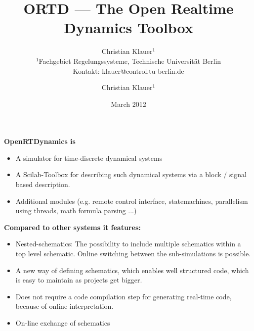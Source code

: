 \documentclass[serif,9pt,xcolor=dvipsnames]{beamer}
\title[]{ORTD --- The Open Realtime Dynamics Toolbox}
\subtitle{} %
\date{March 2012}
\author{Christian Klauer$^{1}$\\
{\tiny $^{1}$Fachgebiet Regelungssysteme, Technische Universität Berlin\\
Kontakt: klauer@control.tu-berlin.de}
}
\begin{document}

\author{Christian Klauer$^{1}$}



\begin{frame}
  \maketitle
\end{frame}


\begin{frame}

\textbf{OpenRTDynamics is}

 \begin{itemize}
  \item A simulator for time-discrete dynamical systems
  \item A Scilab-Toolbox for describing such dynamical systems via a block / signal based description.
  \item Additional modules (e.g. remote control interface, statemachines, parallelism using threads, math formula parsing ...)
 \end{itemize}

\textbf{Compared to other systems it features:}
\begin{itemize}
 \item Nested-schematics: The possibility to include multiple schematics within a top level schematic. Online switching between the sub-simulations is possible.
 \item A new way of defining schematics, which enables well structured code, which is easy to maintain as projects get bigger.
\item Does not require a code compilation step for generating real-time code, because of online interpretation.
\item On-line exchange of schematics
\end{itemize}


\end{frame}
\end{document}
